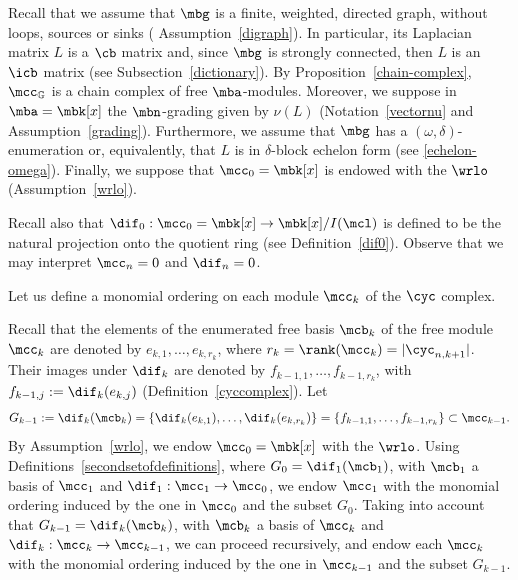 
\begin{remark}
Recall that we assume that $\mbg$ is a finite, weighted, directed
graph, without loops, sources or sinks (\cf
Assumption~\ref{digraph}). In particular, its Laplacian matrix $L$ is
a $\cb$ matrix and, since $\mbg$ is strongly connected, then $L$ is an
$\icb$ matrix (see Subsection~\ref{dictionary}). By
Proposition~\ref{chain-complex}, $\mcc_{\mathbb{G}}$ is a chain
complex of free $\mba$-modules. Moreover, we suppose in $\mba=\mbk[x]$
the $\mbn$-grading given by $\nu(L)$ (\cf Notation~\ref{vectornu} and
Assumption~\ref{grading}). Furthermore, we assume that $\mbg$ has a
$(\omega,\delta)$-enumeration or, equivalently, that $L$ is in
$\delta$-block echelon form (see \ref{echelon-omega}). Finally, we
suppose that $\mcc_0=\mbk[x]$ is endowed with the $\wrlo$
(Assumption~\ref{wrlo}).

Recall also that $\dif_0:\mcc_0=\mbk[x]\to \mbk[x]/I(\mcl)$ is defined
to be the natural projection onto the quotient ring (see
Definition~\ref{dif0}). Observe that we may interpret $\mcc_n=0$ and
$\dif_n=0$.
\end{remark}

Let us define a monomial ordering on each module $\mcc_{k}$ of the
$\cyc$ complex.

\begin{remark}\label{mon-ordering}
Recall that the elements of the enumerated free basis $\mcb_k$ of the
free module $\mcc_k$ are denoted by $e_{k,1},\ldots ,e_{k,r_k}$, where
$r_k=\rank(\mcc_k)=\lvert\cyc_{n,k+1}\rvert$. Their images under
$\dif_k$ are denoted by $f_{k-1,1},\ldots ,f_{k-1,r_k}$, with
$f_{k-1,j}:=\dif_k(e_{k,j})$ (Definition~\ref{cyccomplex}). Let
\begin{eqnarray*}
G_{k-1}:=\dif_k(\mcb_k)= \{\dif_{k}(e_{k,1}),\ldots
,\dif_{k}(e_{k,r_k})\}= \{f_{k-1,1},\ldots
,f_{k-1,r_k}\}\subset\mcc_{k-1}.
\end{eqnarray*}
By Assumption~\ref{wrlo}, we endow $\mcc_0=\mbk[x]$ with the
$\wrlo$. Using Definitions~\ref{secondsetofdefinitions}, where
$G_0=\dif_1(\mcb_1)$, with $\mcb_1$ a basis of $\mcc_1$ and
$\dif_1:\mcc_1\to\mcc_0$, we endow $\mcc_1$ with the monomial ordering
induced by the one in $\mcc_0$ and the subset $G_0$. Taking into
account that $G_{k-1}=\dif_k(\mcb_{k})$, with $\mcb_{k}$ a basis of
$\mcc_k$ and $\dif_k:\mcc_k\to\mcc_{k-1}$, we can proceed recursively,
and endow each $\mcc_k$ with the monomial ordering induced by the one
in $\mcc_{k-1}$ and the subset $G_{k-1}$.
\end{remark}

